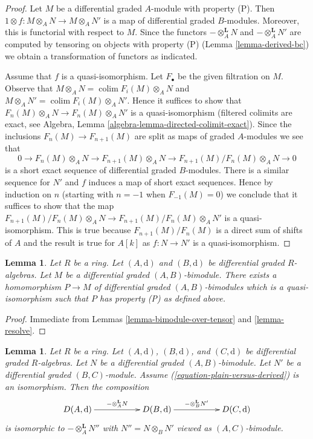 \documentclass{stacks-project}
\theoremstyle{plain}
\newtheorem{lemma}[subsection]{Lemma}
\theoremstyle{definition}
\theoremstyle{remark}
\numberwithin{equation}{subsection}
\def\colim{\mathop{\mathrm{colim}}\nolimits}
\begin{document}
\begin{proof}
Let $M$ be a differential graded $A$-module with property (P).
Then $1 \otimes f : M \otimes_A N \to M \otimes_A N'$ is a
map of differential graded $B$-modules. Moreover, this is functorial
with respect to $M$. Since the functors
$- \otimes_A^\mathbf{L} N$ and $- \otimes_A^\mathbf{L} N'$ are
computed by tensoring on objects with property (P)
(Lemma \ref{lemma-derived-bc}) we obtain a transformation of functors
as indicated.

\medskip\noindent
Assume that $f$ is a quasi-isomorphism. Let $F_\bullet$ be the
given filtration on $M$. Observe that
$M \otimes_A N = \colim F_i(M) \otimes_A N$ and
$M \otimes_A N' = \colim F_i(M) \otimes_A N'$.
Hence it suffices to show that
$F_n(M) \otimes_A N \to F_n(M) \otimes_A N'$
is a quasi-isomorphism (filtered colimits are exact, see
Algebra, Lemma \ref{algebra-lemma-directed-colimit-exact}).
Since the inclusions $F_n(M) \to F_{n + 1}(M)$
are split as maps of graded $A$-modules we see that
$$
0 \to F_n(M) \otimes_A N \to F_{n + 1}(M) \otimes_A N \to
F_{n + 1}(M)/F_n(M) \otimes_A N \to 0
$$
is a short exact sequence of differential graded $B$-modules.
There is a similar sequence for $N'$ and $f$ induces a map
of short exact sequences. Hence by induction on $n$ (starting with $n = -1$
when $F_{-1}(M) = 0$) we conclude that it suffices to show that
the map $F_{n + 1}(M)/F_n(M) \otimes_A N \to F_{n + 1}(M)/F_n(M) \otimes_A N'$
is a quasi-isomorphism. This is true because $F_{n + 1}(M)/F_n(M)$
is a direct sum of shifts of $A$ and the result is true for $A[k]$
as $f : N \to N'$ is a quasi-isomorphism.
\end{proof}

\begin{lemma}
\label{lemma-bimodule-resolve}
Let $R$ be a ring. Let $(A, \text{d})$ and $(B, \text{d})$ be
differential graded $R$-algebras. Let $M$ be a differential graded
$(A, B)$-bimodule. There exists a homomorphism $P \to M$
of differential graded $(A, B)$-bimodules which is a quasi-isomorphism
such that $P$ has property (P) as defined above.
\end{lemma}

\begin{proof}
Immediate from Lemmas \ref{lemma-bimodule-over-tensor} and
\ref{lemma-resolve}.
\end{proof}

\begin{lemma}
\label{lemma-compose-tensor-functors-general}
Let $R$ be a ring. Let $(A, \text{d})$, $(B, \text{d})$, and
$(C, \text{d})$ be differential graded $R$-algebras.
Let $N$ be a differential graded $(A, B)$-bimodule.
Let $N'$ be a differential graded $(B, C)$-module.
Assume (\ref{equation-plain-versus-derived}) is an isomorphism.
Then the composition
$$
\xymatrix{
D(A, \text{d}) \ar[rr]^{- \otimes_A^\mathbf{L} N} & &
D(B, \text{d}) \ar[rr]^{- \otimes_B^\mathbf{L} N'} & &
D(C, \text{d})
}
$$
is isomorphic to $- \otimes_A^\mathbf{L} N''$ with
$N'' = N \otimes_B N'$ viewed as $(A, C)$-bimodule.
\end{lemma}
\end{document}
